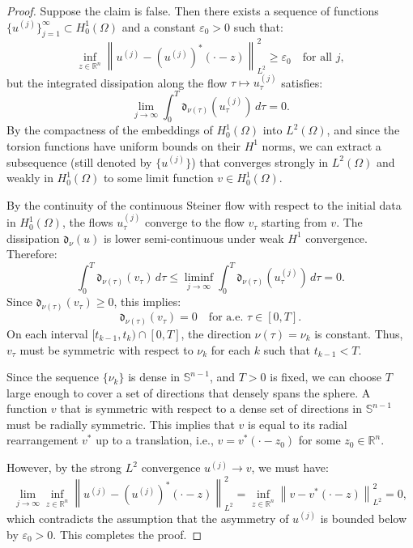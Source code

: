\documentclass[11pt]{article}
\theoremstyle{definition}
\newcommand{\R}{\mathbb R}
\newcommand{\Om}{\Omega}
\newcommand{\Sph}{\mathbb S^{n-1}}
\newcommand{\norm}[1]{\left\|#1\right\|}
\newcommand{\eps}{\varepsilon}
\begin{document}
\begin{proof}
Suppose the claim is false. Then there exists a sequence of functions $\{u^{(j)}\}_{j=1}^\infty \subset H^1_0(\Om)$ and a constant $\eps_0 > 0$ such that:
\begin{equation}
\inf_{z\in\R^n} \norm{u^{(j)} - (u^{(j)})^*(\cdot - z)}_{L^2}^2 \ge \eps_0 \quad \text{for all } j,
\end{equation}
but the integrated dissipation along the flow $\tau \mapsto u^{(j)}_\tau$ satisfies:
\begin{equation}
\lim_{j\to\infty} \int_0^T \mathfrak{d}_{\nu(\tau)}(u^{(j)}_\tau) \, d\tau = 0.
\end{equation}
By the compactness of the embeddings of $H^1_0(\Om)$ into $L^2(\Om)$, and since the torsion functions have uniform bounds on their $H^1$ norms, we can extract a subsequence (still denoted by $\{u^{(j)}\}$) that converges strongly in $L^2(\Om)$ and weakly in $H^1_0(\Om)$ to some limit function $v \in H^1_0(\Om)$.

By the continuity of the continuous Steiner flow with respect to the initial data in $H^1_0(\Om)$, the flows $u^{(j)}_\tau$ converge to the flow $v_\tau$ starting from $v$. The dissipation $\mathfrak{d}_\nu(u)$ is lower semi-continuous under weak $H^1$ convergence. Therefore:
\begin{equation}
\int_0^T \mathfrak{d}_{\nu(\tau)}(v_\tau) \, d\tau \le \liminf_{j\to\infty} \int_0^T \mathfrak{d}_{\nu(\tau)}(u^{(j)}_\tau) \, d\tau = 0.
\end{equation}
Since $\mathfrak{d}_{\nu(\tau)}(v_\tau) \ge 0$, this implies:
\begin{equation}
\mathfrak{d}_{\nu(\tau)}(v_\tau) = 0 \quad \text{for a.e. } \tau \in [0, T].
\end{equation}
On each interval $[t_{k-1}, t_k) \cap [0, T]$, the direction $\nu(\tau) = \nu_k$ is constant. Thus, $v_\tau$ must be symmetric with respect to $\nu_k$ for each $k$ such that $t_{k-1} < T$. 

Since the sequence $\{\nu_k\}$ is dense in $\Sph$, and $T > 0$ is fixed, we can choose $T$ large enough to cover a set of directions that densely spans the sphere. A function $v$ that is symmetric with respect to a dense set of directions in $\Sph$ must be radially symmetric. This implies that $v$ is equal to its radial rearrangement $v^*$ up to a translation, i.e., $v = v^*(\cdot - z_0)$ for some $z_0 \in \R^n$.

However, by the strong $L^2$ convergence $u^{(j)} \to v$, we must have:
\begin{equation}
\lim_{j\to\infty} \inf_{z\in\R^n} \norm{u^{(j)} - (u^{(j)})^*(\cdot - z)}_{L^2}^2 = \inf_{z\in\R^n} \norm{v - v^*(\cdot - z)}_{L^2}^2 = 0,
\end{equation}
which contradicts the assumption that the asymmetry of $u^{(j)}$ is bounded below by $\eps_0 > 0$. This completes the proof.
\end{proof}
\end{document}
